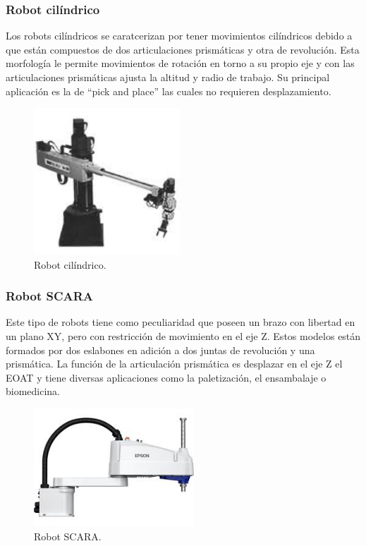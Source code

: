 \subsubsection{Robot cilíndrico}

Los robots cilíndricos se caratcerizan por tener movimientos cilíndricos debido a que están compuestos de dos articulaciones prismáticas y otra de revolución. Esta morfología le permite movimientos de rotación en torno a su propio eje y con las articulaciones prismáticas ajusta la altitud y radio de trabajo. Su principal aplicación es la de ``pick and place'' las cuales no requieren desplazamiento.

\begin{figure} [h!]
  \begin{center}
    \includegraphics[width=5.5cm]{figs/robot_cilindrico}
  \end{center}
  \caption{\centering Robot cilíndrico.}
  \label{fig:robot_cilindrico}
\end{figure} 

\subsubsection{Robot SCARA}

Este tipo de robots tiene como peculiaridad que poseen un brazo con libertad en un plano XY, pero con restricción de movimiento en el eje Z. Estos modelos están formados por dos eslabones en adición a dos juntas de revolución y una prismática. La función de la articulación prismática es desplazar en el eje Z el EOAT y tiene diversas aplicaciones como la paletización, el ensambalaje o biomedicina.

\begin{figure} [h!]
  \begin{center}
    \includegraphics[width=6cm]{figs/robot_SCARA}
  \end{center}
  \caption{\centering Robot SCARA.}
  \label{fig:robot_SCARA}
\end{figure} 

